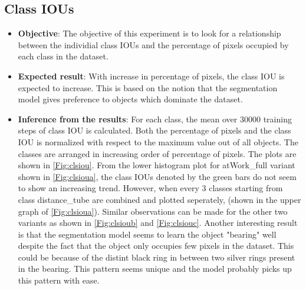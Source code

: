 	\subsection{Class IOUs}	
		\begin{itemize}
			\item \textbf{Objective}: The objective of this experiment is to look for a relationship between the individial class IOUs and the percentage of pixels occupied by each class in the dataset. 
			\item \textbf{Expected result}: With increase in percentage of pixels, the class IOU is expected to increase. This is based on the notion that the segmentation model gives preference to objects which dominate the dataset. 
			\item \textbf{Inference from the results}: For each class, the mean over 30000 training steps of class IOU is calculated. Both the percentage of pixels and the class IOU is normalized with respect to the maximum value out of all objects. The classes are arranged in increasing order of percentage of pixels. The plots are shown in \ref{Fig:clsiou}. From the lower histogram plot for atWork\_full variant shown in \ref{Fig:clsioua}, the class IOUs denoted by the green bars do not seem to show an increasing trend. However, when every 3 classes starting from class distance\_tube are combined and plotted seperately, (shown in the upper graph of \ref{Fig:clsioua}). Similar observations can be made for the other two variants as shown in \ref{Fig:clsioub} and \ref{Fig:clsiouc}. 
			Another interesting result is that the segmentation model seems to learn the object "bearing" well despite the fact that the object only occupies few pixels in the dataset. This could be because of the distint black ring in between two silver rings present in the bearing. This pattern seems unique and the model probably picks up this pattern with ease.
		\end{itemize}
	
